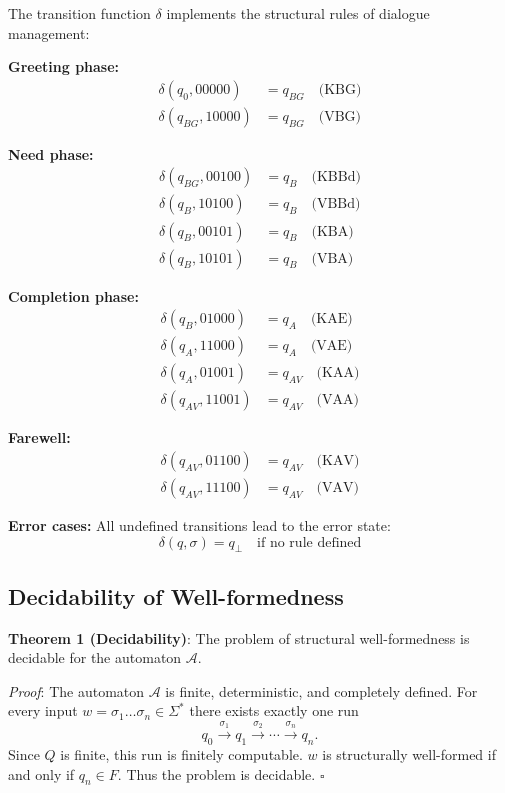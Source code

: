 \documentclass[
  12pt,
  a4paper,
  oneside,
  titlepage
]{article}
\begin{document}
The transition function \(\delta\) implements the structural rules of dialogue 
management:

\textbf{Greeting phase:}
\begin{align*}
\delta(q_0, 00000) &= q_{BG} \quad \text{(KBG)} \\
\delta(q_{BG}, 10000) &= q_{BG} \quad \text{(VBG)}
\end{align*}

\textbf{Need phase:}
\begin{align*}
\delta(q_{BG}, 00100) &= q_B \quad \text{(KBBd)} \\
\delta(q_B, 10100) &= q_B \quad \text{(VBBd)} \\
\delta(q_B, 00101) &= q_B \quad \text{(KBA)} \\
\delta(q_B, 10101) &= q_B \quad \text{(VBA)}
\end{align*}

\textbf{Completion phase:}
\begin{align*}
\delta(q_B, 01000) &= q_A \quad \text{(KAE)} \\
\delta(q_A, 11000) &= q_A \quad \text{(VAE)} \\
\delta(q_A, 01001) &= q_{AV} \quad \text{(KAA)} \\
\delta(q_{AV}, 11001) &= q_{AV} \quad \text{(VAA)}
\end{align*}

\textbf{Farewell:}
\begin{align*}
\delta(q_{AV}, 01100) &= q_{AV} \quad \text{(KAV)} \\
\delta(q_{AV}, 11100) &= q_{AV} \quad \text{(VAV)}
\end{align*}

\textbf{Error cases:}
All undefined transitions lead to the error state:
\[
\delta(q, \sigma) = q_\bot \quad \text{if no rule defined}
\]

\subsection{Decidability of Well-formedness}

\textbf{Theorem 1 (Decidability)}: 
The problem of structural well-formedness is decidable for the automaton 
\(\mathcal{A}\).

\textit{Proof}: The automaton \(\mathcal{A}\) is finite, deterministic, and 
completely defined. For every input \(w = \sigma_1 \ldots \sigma_n \in \Sigma^*\) 
there exists exactly one run
\[
q_0 \xrightarrow{\sigma_1} q_1 \xrightarrow{\sigma_2} \cdots \xrightarrow{\sigma_n} q_n.
\]
Since \(Q\) is finite, this run is finitely computable. 
\(w\) is structurally well-formed if and only if \(q_n \in F\). 
Thus the problem is decidable. \(\square\)
\end{document}
